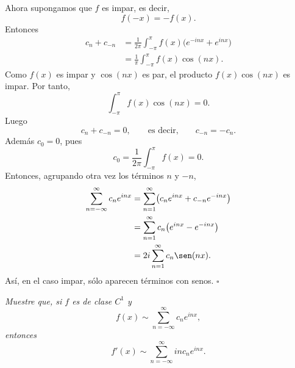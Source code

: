 \documentclass[11pt,letterpaper]{article}
\begin{document}
Ahora supongamos que $f$ es impar, es decir,
\begin{equation*}
    f(-x)=-f(x).
\end{equation*}
Entonces
\begin{align*}
    c_n+c_{-n}
    &=\frac{1}{2\pi}\int_{-\pi}^{\pi}f(x)\bigl(e^{-inx}+e^{inx}\bigr)\\
    &=\frac{1}{\pi}\int_{-\pi}^{\pi}f(x)\cos(nx).
\end{align*}
Como $f(x)$ es impar y $\cos(nx)$ es par, el producto $f(x)\cos(nx)$ es impar. Por tanto,
\begin{equation*}
    \int_{-\pi}^{\pi}f(x)\cos(nx)=0.
\end{equation*}
Luego
\begin{equation*}
    c_n+c_{-n}=0,
    \qquad \text{es decir,}\qquad c_{-n}=-c_n.
\end{equation*}
Además $c_0=0$, pues
\begin{equation*}
    c_0=\frac{1}{2\pi}\int_{-\pi}^{\pi}f(x)=0.
\end{equation*}
Entonces, agrupando otra vez los términos $n$ y $-n$,
\begin{align*}
    \sum_{n=-\infty}^{\infty}c_ne^{inx}
    &=\sum_{n=1}^{\infty}\bigl(c_ne^{inx}+c_{-n}e^{-inx}\bigr) \\
    &=\sum_{n=1}^{\infty}c_n\bigl(e^{inx}-e^{-inx}\bigr) \\
    &=2i\sum_{n=1}^{\infty}c_n\sen(nx).
\end{align*}
Así, en el caso impar, sólo aparecen términos con senos.
\hfill $\square$
\begin{tcolorbox}[title=\textcolor{white}{Problema 5}]
\textit{Muestre que, si $f$ es de clase $C^1$ y}
\begin{equation*}
    f(x)\sim \sum_{n=-\infty}^{\infty}c_ne^{inx},
\end{equation*}
\textit{entonces}
\begin{equation*}
    f'(x)\sim \sum_{n=-\infty}^{\infty}inc_ne^{inx}.
\end{equation*}
\end{tcolorbox}
\end{document}
